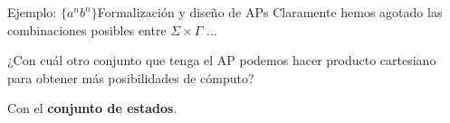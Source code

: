 \documentclass[spanish, handout]{beamer}
\begin{document}
\begin{frame}{Ejemplo: $\{a^n b^n\}$}{Formalización y diseño de APs}
    Claramente hemos agotado las combinaciones posibles entre $\Sigma \times \Gamma$ ... \pause

    \bigskip

    ¿Con cuál otro conjunto que tenga el AP podemos hacer producto cartesiano para obtener más posibilidades de cómputo? \pause

    \bigskip

    Con el \textbf{conjunto de estados}.

    \begin{center}
    \end{center}
    
\end{frame}



% 
% 
\end{document}
